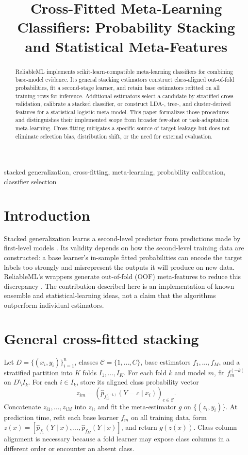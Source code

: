 \documentclass[conference]{IEEEtran}
\title{Cross-Fitted Meta-Learning Classifiers: Probability Stacking and Statistical Meta-Features}
\author{
\jabulaniauthor
\and
\martinchanzauthor
\and
\oloratoauthor
\and
\mfundoauthor
}
\begin{document}
\maketitle

\begin{abstract}
ReliableML implements scikit-learn-compatible meta-learning classifiers for combining base-model evidence. Its general stacking estimators construct class-aligned out-of-fold probabilities, fit a second-stage learner, and retain base estimators refitted on all training rows for inference. Additional estimators select a candidate by stratified cross-validation, calibrate a stacked classifier, or construct LDA-, tree-, and cluster-derived features for a statistical logistic meta-model. This paper formalizes those procedures and distinguishes their implemented scope from broader few-shot or task-adaptation meta-learning. Cross-fitting mitigates a specific source of target leakage but does not eliminate selection bias, distribution shift, or the need for external evaluation.
\end{abstract}

\begin{IEEEkeywords}
stacked generalization, cross-fitting, meta-learning, probability calibration, classifier selection
\end{IEEEkeywords}

\section{Introduction}
Stacked generalization learns a second-level predictor from predictions made by first-level models \cite{wolpert1992,breiman1996}. Its validity depends on how the second-level training data are constructed: a base learner's in-sample fitted probabilities can encode the target labels too strongly and misrepresent the outputs it will produce on new data. ReliableML's wrappers generate out-of-fold (OOF) meta-features to reduce this discrepancy \cite{software}. The contribution described here is an implementation of known ensemble and statistical-learning ideas, not a claim that the algorithms outperform individual estimators.

\section{General cross-fitted stacking}
Let \(D=\{(x_i,y_i)\}_{i=1}^{n}\), classes \(\mathcal C=\{1,\ldots,C\}\), base estimators \(f_1,\ldots,f_M\), and a stratified partition into \(K\) folds \(I_1,\ldots,I_K\). For each fold \(k\) and model \(m\), fit \(f_m^{(-k)}\) on \(D\setminus I_k\). For each \(i\in I_k\), store its aligned class probability vector
\[
z_{im}=\left(\hat p_{f_m^{(-k)}}(Y=c\mid x_i)\right)_{c\in\mathcal C}.
\]
Concatenate \(z_{i1},\ldots,z_{iM}\) into \(z_i\), and fit the meta-estimator \(g\) on \(\{(z_i,y_i)\}\). At prediction time, refit each base learner \(f_m\) on all training data, form \(z(x)=[\hat p_{f_1}(Y\mid x),\ldots,\hat p_{f_M}(Y\mid x)]\), and return \(g(z(x))\). Class-column alignment is necessary because a fold learner may expose class columns in a different order or encounter an absent class.
\end{document}
